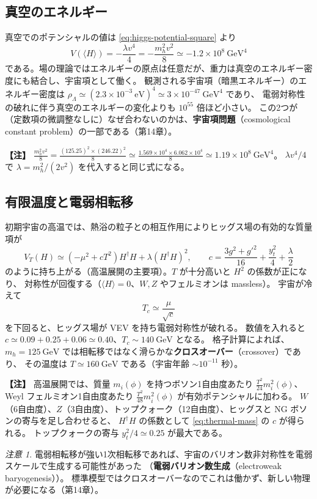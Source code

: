 \documentclass[uplatex,dvipdfmx,a4paper,11pt,openany]{jsbook}
\newcommand{\term}[2]{\textbf{#1}（#2）}
\newenvironment{note}{\vspace{1ex}\par\footnotesize\noindent\textbf{【注】}}{\par\vspace{1ex}}
\numberwithin{equation}{chapter}
\theoremstyle{definition}
\theoremstyle{plain}
\theoremstyle{remark}
\newtheorem{remark}{注意}[chapter]
\begin{document}
\subsection{真空のエネルギー}
真空でのポテンシャルの値は \eqref{eq:higgs-potential-square} より
\begin{equation}
V(\langle H\rangle)=-\frac{\lambda v^4}{4}=-\frac{m_h^2v^2}{8}\simeq-1.2\times10^{8}\ \mathrm{GeV}^4
\end{equation}
である。場の理論ではエネルギーの原点は任意だが、重力は真空のエネルギー密度にも結合し、宇宙項として働く。
観測される宇宙項（暗黒エネルギー）のエネルギー密度は $\rho_\Lambda\simeq(2.3\times10^{-3}\ \mathrm{eV})^4\simeq3\times10^{-47}\ \mathrm{GeV}^4$ であり、
電弱対称性の破れに伴う真空のエネルギーの変化よりも $10^{55}$ 倍ほど小さい。
この2つが（定数項の微調整なしに）なぜ合わないのかは、\term{宇宙項問題}{cosmological constant problem}の一部である（第14章）。
\begin{note}
$\frac{m_h^2v^2}{8}=\frac{(125.25)^2\times(246.22)^2}{8}\simeq\frac{1.569\times10^4\times6.062\times10^4}{8}\simeq1.19\times10^8\ \mathrm{GeV}^4$。
$\lambda v^4/4$ で $\lambda=m_h^2/(2v^2)$ を代入すると同じ式になる。
\end{note}
\subsection{有限温度と電弱相転移}
初期宇宙の高温では、熱浴の粒子との相互作用によりヒッグス場の有効的な質量項が
\begin{equation}
V_T(H)\simeq\left(-\mu^2+cT^2\right)H^\dagger H+\lambda\left(H^\dagger H\right)^2,
\qquad
c=\frac{3g^2+g'^2}{16}+\frac{y_t^2}{4}+\frac\lambda2
\label{eq:thermal-mass}
\end{equation}
のように持ち上がる（高温展開の主要項）。$T$ が十分高いと $H^2$ の係数が正になり、
対称性が回復する（$\langle H\rangle=0$、$W,Z$ やフェルミオンは massless）。
宇宙が冷えて
\begin{equation}
T_c\simeq\frac{\mu}{\sqrt c}
\end{equation}
を下回ると、ヒッグス場が VEV を持ち電弱対称性が破れる。
数値を入れると $c\simeq0.09+0.25+0.06\simeq0.40$、$T_c\sim140\ \mathrm{GeV}$ となる。
格子計算によれば、$m_h=125\ \mathrm{GeV}$ では相転移ではなく滑らかな\term{クロスオーバー}{crossover}であり、
その温度は $T\simeq160\ \mathrm{GeV}$ である（宇宙年齢 $\sim10^{-11}$ 秒）。
\begin{note}
高温展開では、質量 $m_i(\phi)$ を持つボソン1自由度あたり $\frac{T^2}{24}m_i^2(\phi)$、
Weyl フェルミオン1自由度あたり $\frac{T^2}{48}m_i^2(\phi)$ が有効ポテンシャルに加わる。
$W$（6自由度）、$Z$（3自由度）、トップクォーク（12自由度）、ヒッグスと NG ボソンの寄与を足し合わせると、
$H^\dagger H$ の係数として \eqref{eq:thermal-mass} の $c$ が得られる。
トップクォークの寄与 $y_t^2/4\simeq0.25$ が最大である。
\end{note}
\begin{remark}
電弱相転移が強い1次相転移であれば、宇宙のバリオン数非対称性を電弱スケールで生成する可能性があった
（\term{電弱バリオン数生成}{electroweak baryogenesis}）。
標準模型ではクロスオーバーなのでこれは働かず、新しい物理が必要になる（第14章）。
\end{remark}
\end{document}
